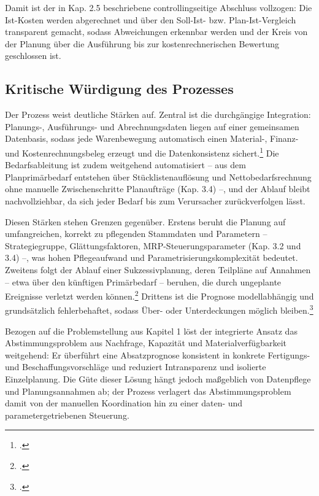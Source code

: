 Damit ist der in Kap. 2.5 beschriebene controllingseitige Abschluss vollzogen: Die Ist-Kosten werden abgerechnet und über den Soll-Ist- bzw. Plan-Ist-Vergleich transparent gemacht, sodass Abweichungen erkennbar werden und der Kreis von der Planung über die Ausführung bis zur kostenrechnerischen Bewertung geschlossen ist.

\subsection{Kritische Würdigung des Prozesses}
Der Prozess weist deutliche Stärken auf. Zentral ist die durchgängige Integration: Planungs-, Ausführungs- und Abrechnungsdaten liegen auf einer gemeinsamen Datenbasis, sodass jede Warenbewegung automatisch einen Material-, Finanz- und Kostenrechnungsbeleg erzeugt und die Datenkonsistenz sichert.\footcites[Vgl.][S. 212 ff.]{Kurbel.2021}[][Folie 56]{SAPUCC.2023} Die Bedarfsableitung ist zudem weitgehend automatisiert -- aus dem Planprimärbedarf entstehen über Stücklistenauflösung und Nettobedarfsrechnung ohne manuelle Zwischenschritte Planaufträge (Kap. 3.4) --, und der Ablauf bleibt nachvollziehbar, da sich jeder Bedarf bis zum Verursacher zurückverfolgen lässt.

Diesen Stärken stehen Grenzen gegenüber. Erstens beruht die Planung auf umfangreichen, korrekt zu pflegenden Stammdaten und Parametern -- Strategiegruppe, Glättungsfaktoren, MRP-Steuerungsparameter (Kap. 3.2 und 3.4) --, was hohen Pflegeaufwand und Parametrisierungskomplexität bedeutet. Zweitens folgt der Ablauf einer Sukzessivplanung, deren Teilpläne auf Annahmen -- etwa über den künftigen Primärbedarf -- beruhen, die durch ungeplante Ereignisse verletzt werden können.\footcite[Vgl.][S. 33]{Kurbel.2021} Drittens ist die Prognose modellabhängig und grundsätzlich fehlerbehaftet, sodass Über- oder Unterdeckungen möglich bleiben.\footcite[Vgl.][Folie 27]{SAPUCC.2023}

Bezogen auf die Problemstellung aus Kapitel 1 löst der integrierte Ansatz das Abstimmungsproblem aus Nachfrage, Kapazität und Materialverfügbarkeit weitgehend: Er überführt eine Absatzprognose konsistent in konkrete Fertigungs- und Beschaffungsvorschläge und reduziert Intransparenz und isolierte Einzelplanung. Die Güte dieser Lösung hängt jedoch maßgeblich von Datenpflege und Planungsannahmen ab; der Prozess verlagert das Abstimmungsproblem damit von der manuellen Koordination hin zu einer daten- und parametergetriebenen Steuerung.
